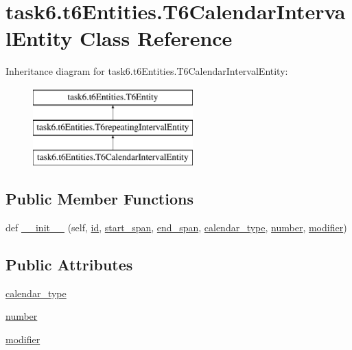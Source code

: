 \hypertarget{classtask6_1_1t6Entities_1_1T6CalendarIntervalEntity}{}\section{task6.\+t6\+Entities.\+T6\+Calendar\+Interval\+Entity Class Reference}
\label{classtask6_1_1t6Entities_1_1T6CalendarIntervalEntity}
Inheritance diagram for task6.\+t6\+Entities.\+T6\+Calendar\+Interval\+Entity\+:\begin{figure}[H]
\begin{center}
\leavevmode
\includegraphics[height=3.000000cm]{classtask6_1_1t6Entities_1_1T6CalendarIntervalEntity}
\end{center}
\end{figure}
\subsection*{Public Member Functions}
\begin{DoxyCompactItemize}
\item 
def \hyperlink{classtask6_1_1t6Entities_1_1T6CalendarIntervalEntity_a5cbe4f08ae498af3f13edbd42e8d02d3}{\+\_\+\+\_\+init\+\_\+\+\_\+} (self, \hyperlink{classtask6_1_1t6Entities_1_1T6Entity_afeeced8134bb3ebe0cfecc64d0ab46a4}{id}, \hyperlink{classtask6_1_1t6Entities_1_1T6Entity_a52779e9af8864dc98e8b02fc5b9b041a}{start\+\_\+span}, \hyperlink{classtask6_1_1t6Entities_1_1T6Entity_aeb402200b156cd9562c5111dfe777b98}{end\+\_\+span}, \hyperlink{classtask6_1_1t6Entities_1_1T6CalendarIntervalEntity_a57d20d358dfc92c6b25f04c2296ee919}{calendar\+\_\+type}, \hyperlink{classtask6_1_1t6Entities_1_1T6CalendarIntervalEntity_acfb01d089dbc4f2fe2e433c74405b950}{number}, \hyperlink{classtask6_1_1t6Entities_1_1T6CalendarIntervalEntity_ae40ab2003ae494a5e478e7614f26acd9}{modifier})
\end{DoxyCompactItemize}
\subsection*{Public Attributes}
\begin{DoxyCompactItemize}
\item 
\hyperlink{classtask6_1_1t6Entities_1_1T6CalendarIntervalEntity_a57d20d358dfc92c6b25f04c2296ee919}{calendar\+\_\+type}
\item 
\hyperlink{classtask6_1_1t6Entities_1_1T6CalendarIntervalEntity_acfb01d089dbc4f2fe2e433c74405b950}{number}
\item 
\hyperlink{classtask6_1_1t6Entities_1_1T6CalendarIntervalEntity_ae40ab2003ae494a5e478e7614f26acd9}{modifier}
\end{DoxyCompactItemize}


